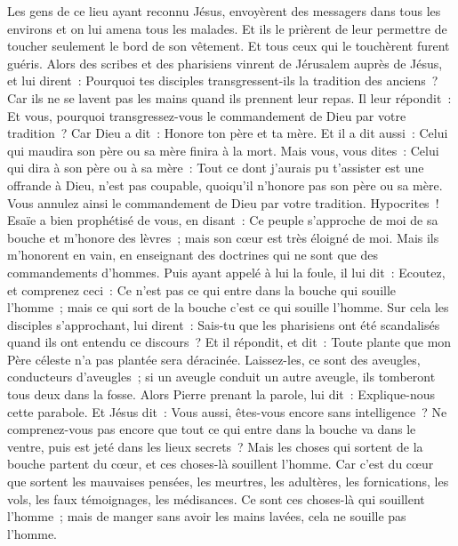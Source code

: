 \begin{multicols}{2}
Les gens de ce lieu ayant reconnu Jésus, envoyèrent des messagers dans tous les environs et on lui amena tous les malades.
Et ils le prièrent de leur permettre de toucher seulement le bord de son vêtement. Et tous ceux qui le touchèrent furent guéris.
\VerseOne{}Alors des scribes et des pharisiens vinrent de Jérusalem auprès de Jésus, et lui dirent~:
Pourquoi tes disciples transgressent-ils la tradition des anciens~? Car ils ne se lavent pas les mains quand ils prennent leur repas.
Il leur répondit~: Et vous, pourquoi transgressez-vous le commandement de Dieu par votre tradition~?
Car Dieu a dit~: Honore ton père et ta mère. Et il a dit aussi~: Celui qui maudira son père ou sa mère finira à la mort.
Mais vous, vous dites~: Celui qui dira à son père ou à sa mère~: Tout ce dont j'aurais pu t'assister est une offrande à Dieu, n'est pas coupable, quoiqu'il n'honore pas son père ou sa mère.
Vous annulez ainsi le commandement de Dieu par votre tradition.
Hypocrites~! Esaïe a bien prophétisé de vous, en disant~:
Ce peuple s'approche de moi de sa bouche et m'honore des lèvres~; mais son cœur est très éloigné de moi.
Mais ils m'honorent en vain, en enseignant des doctrines qui ne sont que des commandements d'hommes.
Puis ayant appelé à lui la foule, il lui dit~: Ecoutez, et comprenez ceci~:
Ce n'est pas ce qui entre dans la bouche qui souille l'homme~; mais ce qui sort de la bouche c'est ce qui souille l'homme.
Sur cela les disciples s'approchant, lui dirent~: Sais-tu que les pharisiens ont été scandalisés quand ils ont entendu ce discours~?
Et il répondit, et dit~: Toute plante que mon Père céleste n'a pas plantée sera déracinée.
Laissez-les, ce sont des aveugles, conducteurs d'aveugles~; si un aveugle conduit un autre aveugle, ils tomberont tous deux dans la fosse.
Alors Pierre prenant la parole, lui dit~: Explique-nous cette parabole.
Et Jésus dit~: Vous aussi, êtes-vous encore sans intelligence~?
Ne comprenez-vous pas encore que tout ce qui entre dans la bouche va dans le ventre, puis est jeté dans les lieux secrets~?
Mais les choses qui sortent de la bouche partent du cœur, et ces choses-là souillent l'homme.
Car c'est du cœur que sortent les mauvaises pensées, les meurtres, les adultères, les fornications, les vols, les faux témoignages, les médisances.
Ce sont ces choses-là qui souillent l'homme~; mais de manger sans avoir les mains lavées, cela ne souille pas l'homme.

\end{multicols}
